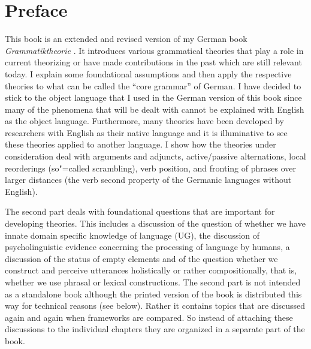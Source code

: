 \chapter*{Preface}

This book is an extended and revised version of my German book \emph{Grammatiktheorie}
\citep{MuellerGTBuch2}. It introduces various grammatical theories that play a role in current
theorizing or have made contributions in the past which are still relevant today. I explain some foundational
assumptions and then apply the respective theories to what can be called the ``core grammar'' of
German. I have decided to stick to the object language that I used in the German version of this
book since many of the phenomena that will be dealt with cannot be explained with English as the object
language. Furthermore, many theories have been developed by researchers with English as their native
language and it is illuminative to see these theories applied to another language.
I show how the theories under consideration deal with arguments and adjuncts, active/passive
alternations, local reorderings (so"=called scrambling), verb position, and fronting of phrases over
larger distances (the verb second property of the Germanic languages without English).

The second part deals with foundational questions that are important for developing theories.
This includes a discussion of the question of whether we have innate domain specific knowledge of
language (UG), the discussion of psycholinguistic evidence concerning the processing of language by
humans, a discussion of the status of empty elements and of the question whether we construct and perceive utterances 
holistically or rather compositionally, that is, whether we use phrasal or lexical
constructions. The second part is not intended as a standalone book although the printed version of
the book is distributed this way for technical reasons (see below). Rather it contains topics that are discussed again and again when frameworks are
compared. So instead of attaching these discussions to the individual chapters they are organized in
a separate part of the book.

